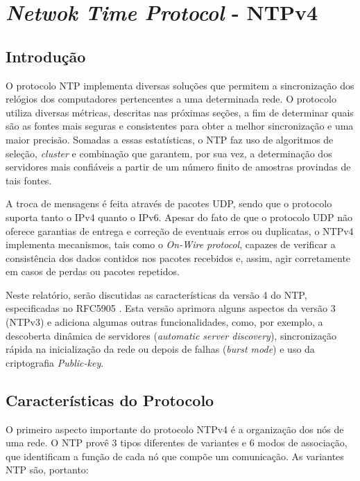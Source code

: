 \section {\textit{Netwok Time Protocol} - NTPv4}

\subsection {Introdução}

O protocolo NTP implementa diversas soluções que permitem a sincronização dos
relógios dos computadores pertencentes a uma determinada rede. O protocolo
utiliza diversas métricas, descritas nas próximas seções, a fim de determinar
quais são as fontes mais seguras e consistentes para obter a melhor
sincronização e uma maior precisão. Somadas a essas estatísticas, o NTP faz uso
de algoritmos de seleção, \textit{cluster} e combinação que garantem, por sua
vez, a determinação dos servidores mais confiáveis a partir de um número finito
de amostras provindas de tais fontes. 

\vspace{12pt}

A troca de mensagens é feita através de pacotes UDP, sendo que o protocolo
suporta tanto o IPv4 quanto o IPv6. Apesar do fato de que o protocolo UDP não
oferece garantias de entrega e correção de eventuais erros ou duplicatas, o
NTPv4 implementa mecanismos, tais como o \textit{On-Wire protocol}, capazes de
verificar a consistência dos dados contidos nos pacotes recebidos e, assim,
agir corretamente em casos de perdas ou pacotes repetidos.

\vspace{12pt}

Neste relatório, serão discutidas as características da versão 4 do NTP,
especificadas no RFC5905 \cite{ntpv4rtp}. Esta versão aprimora alguns aspectos
da versão 3 (NTPv3) e adiciona algumas outras funcionalidades, como, por exemplo, a
descoberta dinâmica de servidores (\textit{automatic server discovery}),
sincronização rápida na inicialização da rede ou depois de falhas
(\textit{burst mode}) e uso da criptografia \textit{Public-key}.

\subsection {Características do Protocolo}

O primeiro aspecto importante do protocolo NTPv4 é a organização dos
nós de uma rede. O NTP provê 3 tipos diferentes de variantes 
e 6 modos de associação, que identificam a função de cada nó que
compõe um comunicação. As variantes NTP são, portanto:

